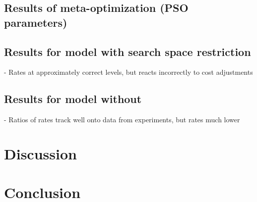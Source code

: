\documentclass[12pt]{article}
\begin{document}
\subsection{Results of meta-optimization (PSO parameters)}
\subsection{Results for model with search space restriction}
- Rates at approximately correct levels, but reacts incorrectly to cost adjustments
\subsection{Results for model without}
- Ratios of rates track well onto data from experiments, but rates much lower


\section{Discussion}



\section{Conclusion}





\end{document}
